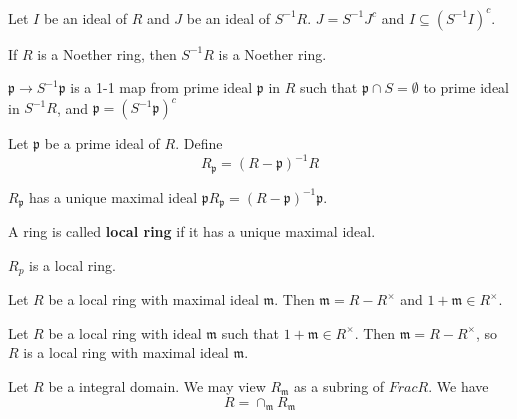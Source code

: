 \documentclass[12pt]{book}
\begin{document}
	\begin{lemma}
		Let $I$ be an ideal of $R$ and $J$ be an ideal of $S^{-1}R$. $J=S^{-1}J^c$ and $I\subseteq (S^{-1}I)^c$.
	\end{lemma}
	
	\begin{theorem}
		If $R$ is a Noether ring, then $S^{-1}R$ is a Noether ring.
	\end{theorem}
	
	\begin{theorem}
		$\mathfrak p\rightarrow S^{-1}\mathfrak p$ is a 1-1 map from prime ideal $\mathfrak p$ in $R$ such that $\mathfrak p\cap S=\emptyset$ to prime ideal in $S^{-1}R$, and $\mathfrak p=(S^{-1}\mathfrak p)^c$
	\end{theorem}
	
	\begin{definition}
		Let $\mathfrak p$ be a prime ideal of $R$. Define
		\begin{equation}
			R_{\mathfrak p}=(R-\mathfrak p)^{-1}R
		\end{equation}
	\end{definition}
	
	\begin{lemma}
		$R_{\mathfrak p}$ has a unique maximal ideal $\mathfrak pR_{\mathfrak p}=(R-\mathfrak p)^{-1}\mathfrak p$. 
	\end{lemma}
	
	\begin{definition}
		A ring is called {\bf local ring} if it has a unique maximal ideal.
	\end{definition}
	
	$R_p$ is a local ring.
	
	\begin{lemma}
		Let $R$ be a local ring with maximal ideal $\mathfrak m$. Then $\mathfrak m=R-R^\times$ and $1+\mathfrak m\in R^\times$.
	\end{lemma}
	
	\begin{lemma}
		Let $R$ be a local ring with ideal $\mathfrak m$ such that $1+\mathfrak m\in R^\times$. Then $\mathfrak m=R-R^\times$, so $R$ is a local ring with maximal ideal $\mathfrak m$.
	\end{lemma}
	
	\begin{theorem}
		Let $R$ be a integral domain. We may view $R_{\mathfrak m}$ as a subring of $FracR$. We have
		\begin{equation}
			R=\cap_{\mathfrak m} R_{\mathfrak m}
		\end{equation}
	\end{theorem}
	
\end{document}
